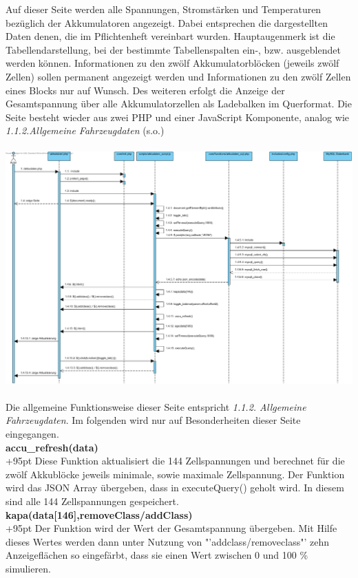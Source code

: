 \documentclass[fontsize = 12pt, paper = a4]{scrreprt}
\begin{document}
Auf dieser Seite werden alle Spannungen, Stromstärken und Temperaturen bezüglich der Akkumulatoren angezeigt. Dabei entsprechen die dargestellten Daten denen, die im Pflichtenheft vereinbart wurden. Hauptaugenmerk  ist die Tabellendarstellung, bei der bestimmte Tabellenspalten ein-, bzw. ausgeblendet werden können. Informationen zu den zwölf Akkumulatorblöcken (jeweils zwölf Zellen) sollen permanent angezeigt werden und Informationen zu den zwölf Zellen eines Blocks nur auf Wunsch. Des weiteren erfolgt die Anzeige der Gesamtspannung über alle Akkumulatorzellen als Ladebalken im Querformat. Die Seite besteht wieder aus zwei PHP  und einer JavaScript Komponente, analog wie \textit{ 1.1.2.Allgemeine Fahrzeugdaten} (s.o.)  
\\ \\
\includegraphics[scale=0.4255]{akkudatenvpp.png}
\\ \\ 
Die allgemeine Funktionsweise dieser Seite entspricht \textit{1.1.2. Allgemeine Fahrzeugdaten}. Im folgenden wird nur auf Besonderheiten dieser Seite eingegangen.\\

\textbf{accu\_refresh(data)}\\

\hangindent+95pt  
Diese Funktion aktualisiert die 144 Zellspannungen und berechnet für die zwölf Akkublöcke jeweils minimale, sowie maximale Zellspannung. Der Funktion wird das JSON Array übergeben, dass in executeQuery() geholt wird. In diesem sind alle 144 Zellspannungen gespeichert.\\


\textbf{kapa(data[146],removeClass/addClass)}\\
\hangindent+95pt  
Der Funktion wird der Wert der Gesamtspannung übergeben. Mit Hilfe dieses Wertes werden dann unter Nutzung von "'addclass/removeclass"' zehn Anzeigeflächen so eingefärbt, dass sie einen Wert zwischen 0 und 100 \% simulieren.\\
\end{document}
